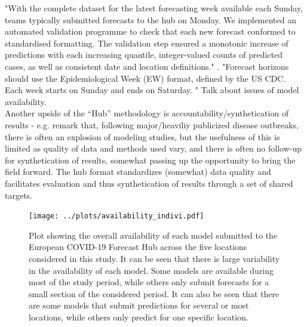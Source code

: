 "With the complete dataset for the latest forecasting week available each Sunday, teams typically
submitted forecasts to the hub on Monday. We implemented an automated validation
programme to check that each new forecast conformed to standardised formatting. The
validation step ensured a monotonic increase of predictions with each increasing quantile,
integer-valued counts of predicted cases, as well as consistent date and location definitions." \citep{sherratt_draft_nodate}.
"Forecast horizons should use the Epidemiological Week (EW) format, defined by the US CDC. Each week starts on Sunday and ends on Saturday. "
Talk about issues of model availability.\\
Another upside of the ``Hub'' methodology is accountability/synthetication of results - e.g. \cite{metcalf_opportunities_2017} remark that, following major/heaviliy publicized disease outbreaks, there is often an explosion of modeling studies, but the usefulness of this is limited as quality of data and methods used vary, and there is often no follow-up for synthetication of results, somewhat passing up the opportunity to bring the field forward. The hub format standardizes (somewhat) data quality and facilitates evaluation and thus synthetication of results through a set of shared targets. 
\begin{figure}
\texttt{[image: ../plots/availability\_indivi.pdf]}
\caption{Plot showing the overall availability of each model submitted to the European COVID-19 Forecast Hub across the five locations considered in this study. It can be seen that there is large variability in the availability of each model. Some models are available during most of the study period, while others only submit forecasts for a small section of the considered period. It can also be seen that there are some models that submit predictions for several or most locations, while others only predict for one specific location.}
\end{figure}
